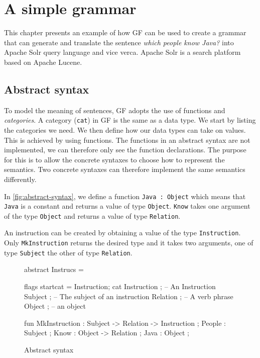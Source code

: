\chapter{A simple grammar}\label{ch:simple-grammar}
This chapter presents an example of how GF can be used to create a grammar that can generate and translate the sentence \emph{which people know Java?} into Apache Solr query language and vice verca. Apache Solr is a search platform based on Apache Lucene.

\section{Abstract syntax}
To model the meaning of sentences, GF adopts the use of functions and \emph{categories}. A category (\texttt{cat}) in GF is the same as a data type. We start by listing the categories we need. We then define how our data types can take on values. This is achieved by using functions. The functions in an abstract syntax are not implemented, we can therefore only see the function declarations. The purpose for this is to allow the concrete syntaxes to choose how to represent the semantics. Two concrete syntaxes can therefore implement the same semantics differently.

In \autoref{fig:abstract-syntax}, we define a function \texttt{Java : Object} which means that \texttt{Java} is a constant  and returns a value of type \texttt{Object}. \texttt{Know} takes one argument of the type \texttt{Object} and returns a value of type \texttt{Relation}.

An instruction can be created by obtaining a value of the type \texttt{Instruction}. Only \texttt{MkInstruction} returns the desired type and it takes two arguments, one of type \texttt{Subject} the other of type \texttt{Relation}.

\begin{figure}[h]
\begin{code}
abstract Instrucs = { 
  flags startcat = Instruction; 
  cat
    Instruction ; -- An Instruction
    Subject ;  -- The subject of an instruction
    Relation ; -- A verb phrase
    Object ;   -- an object

  fun		 	  
    MkInstruction : Subject -> Relation -> Instruction ;
    People : Subject ;
    Know : Object -> Relation ;
    Java : Object ; 
}
\end{code}
\caption{Abstract syntax\label{fig:abstract-syntax}}
\end{figure}

